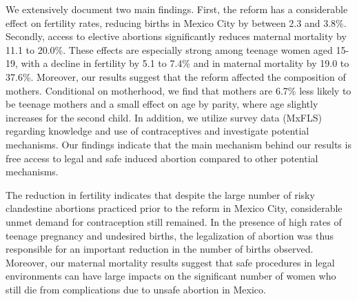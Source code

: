\documentclass[a4paper, 11pt]{article}
\begin{document}
\begin{spacing}{2}
We extensively document two main findings. First, the reform has a considerable effect on fertility rates, reducing births in Mexico City by between 2.3 and 3.8\%. Secondly, access to elective abortions significantly reduces maternal mortality by 11.1 to 20.0\%. These effects are especially strong among teenage women aged 15-19, with a decline in fertility by 5.1 to 7.4\% and in maternal mortality by 19.0 to 37.6\%. Moreover, our results suggest that the reform affected the composition of mothers. Conditional on motherhood, we find that mothers are 6.7\% less likely to be teenage mothers and a small effect on age by parity, where age slightly increases for the second child. In addition, we utilize survey data (MxFLS) regarding knowledge and use of contraceptives and investigate potential mechanisms. Our findings indicate that the main mechanism behind our results is free access to legal and safe induced abortion compared to other potential mechanisms.
 
The reduction in fertility indicates that despite the large number of risky clandestine abortions practiced prior to the reform in Mexico City, considerable unmet demand for contraception still remained. In the presence of high rates of teenage pregnancy and undesired births, the legalization of abortion was thus responsible for an important reduction in the number of births observed. Moreover, our maternal mortality results suggest that safe procedures in legal environments can have large impacts on the significant number of women who still die from complications due to unsafe abortion in Mexico. 
 
\end{spacing}
\newpage


\end{document}
